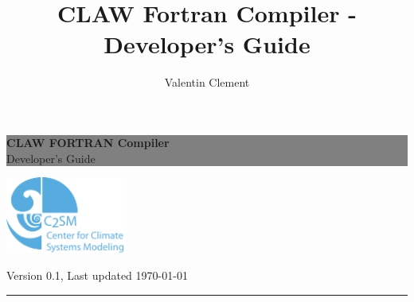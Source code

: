 \documentclass[a4paper, 11pt]{report}
\author{Valentin Clement}
\title{CLAW Fortran Compiler - Developer's Guide}
\newcommand{\HRule}{\rule{\linewidth}{0.5mm}}
\newcommand{\emptypage}{}
\begin{document}
\thispagestyle{empty} %

\colorbox{grey}{
	\parbox[t]{1.0\linewidth}{
		\centering \fontsize{35pt}{80pt}\selectfont %
		\vspace*{2cm} %
		
		\hfill \textbf{CLAW FORTRAN Compiler} \\
		\hfill Developer's Guide\par
		
		\vspace*{2cm} %
	}
}

\vfill

\begin{center}
\includegraphics[width=4cm]{resources/c2sm_logo.pdf} \\
\end{center}

\vfill %

\begin{center}
Version 0.1, Last updated \today
\end{center}
\HRule

\clearpage %




%

\end{document}
